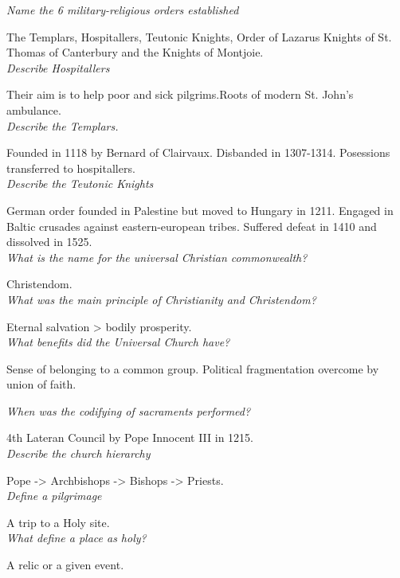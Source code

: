 \documentclass[12pt]{article}
\begin{document}
\textit{Name the 6 military-religious orders established}

The Templars, Hospitallers, Teutonic Knights, Order of Lazarus Knights of St. Thomas of Canterbury and the Knights of Montjoie.\\

\textit{Describe Hospitallers}

Their aim is to help poor and sick pilgrims.Roots of modern St. John's ambulance.\\

\textit{Describe the Templars.}

Founded in 1118 by Bernard of Clairvaux. Disbanded in 1307-1314. Posessions transferred to hospitallers.\\

\textit{Describe the Teutonic Knights}

German order founded in Palestine but moved to Hungary in 1211. Engaged in Baltic crusades against eastern-european tribes. Suffered defeat in 1410 and dissolved in 1525.\\

\textit{What is the name for the universal Christian commonwealth?}

Christendom.\\

\textit{What was the main principle of Christianity and Christendom?}

Eternal salvation > bodily prosperity.\\

\textit{What benefits did the Universal Church have?}

Sense of belonging to a common group. Political fragmentation overcome by union of faith.

\textit{When was the codifying of sacraments performed?}

4th Lateran Council by Pope Innocent III in 1215.\\

\textit{Describe the church hierarchy}

Pope -> Archbishops -> Bishops -> Priests.\\

\textit{Define a pilgrimage}

A trip to a Holy site.\\

\textit{What define a place as holy?}

A relic or a given event.\\
\end{document}
